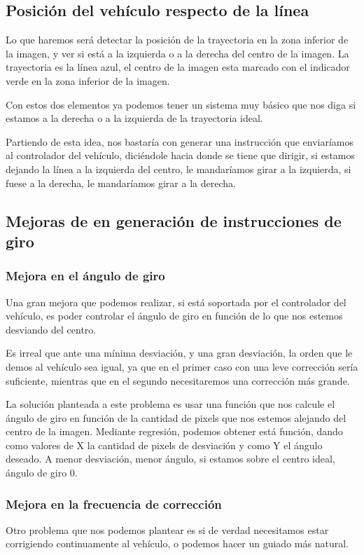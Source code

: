 
\subsection{Posición del vehículo respecto de la línea}
Lo que haremos será detectar la posición de la trayectoria en la zona inferior de la imagen, y ver si está a la izquierda o a la derecha del centro de la imagen. La trayectoria es la línea azul, el centro de la imagen esta marcado con el indicador verde en la zona inferior de la imagen.

Con estos dos elementos ya podemos tener un sistema muy básico que nos diga si estamos a la derecha o a la izquierda de la trayectoria ideal.

Partiendo de esta idea, nos bastaría con generar una instrucción que enviaríamos al controlador del vehículo, diciéndole hacia donde se tiene que dirigir, si estamos dejando la línea a la izquierda del centro, le mandaríamos girar a la izquierda, si fuese a la derecha, le mandaríamos girar a la derecha.

\subsection{Mejoras de en generación de instrucciones de giro}

\subsubsection{Mejora en el ángulo de giro}
Una gran mejora que podemos realizar, si está soportada por el controlador del vehículo, es poder controlar el ángulo de giro en función de lo que nos estemos desviando del centro. 

Es irreal que ante una mínima desviación, y una gran desviación, la orden que le demos al vehículo sea igual, ya que en el primer caso con una leve corrección sería suficiente, mientras que en el segundo necesitaremos una corrección más grande.

La solución planteada a este problema es usar una función que nos calcule el ángulo de giro en función de la cantidad de pixels que nos estemos alejando del centro de la imagen. Mediante regresión, podemos obtener está función, dando como valores de X la cantidad de pixels de desviación y como Y el ángulo deseado. A menor desviación, menor ángulo, si estamos sobre el centro ideal, ángulo de giro 0.

\subsubsection{Mejora en la frecuencia de corrección}
Otro problema que nos podemos plantear es si de verdad necesitamos estar corrigiendo continuamente al vehículo, o podemos hacer un guiado más natural.

